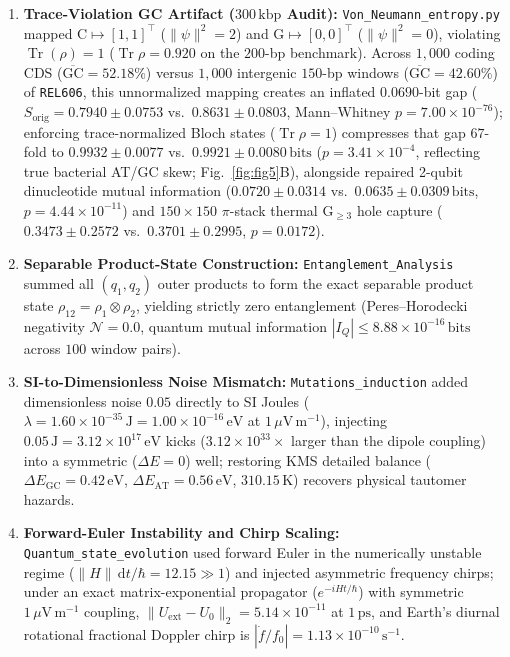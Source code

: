 \documentclass[10pt,letterpaper]{article}
\theoremstyle{plain}
\theoremstyle{definition}
\newcommand{\Tr}{\operatorname{Tr}}
\begin{document}
\begin{enumerate}[leftmargin=1.8em,itemsep=2pt]
    \item \textbf{Trace-Violation GC Artifact ($300\,\mathrm{kbp}$ Audit):} \texttt{Von\_\allowbreak Neumann\_\allowbreak entropy.py} mapped $\mathrm{C} \mapsto [1,1]^\top$ ($\|\psi\|^2 = 2$) and $\mathrm{G} \mapsto [0,0]^\top$ ($\|\psi\|^2 = 0$), violating $\Tr(\rho) = 1$ ($\Tr\rho = 0.920$ on the $200$-bp benchmark). Across $1{,}000$ coding CDS ($\overline{\mathrm{GC}} = 52.18\%$) versus $1{,}000$ intergenic $150$-bp windows ($\overline{\mathrm{GC}} = 42.60\%$) of \texttt{REL606}, this unnormalized mapping creates an inflated $0.0690$-bit gap ($S_{\mathrm{orig}} = 0.7940 \pm 0.0753$ vs.\ $0.8631 \pm 0.0803$, Mann--Whitney $p = 7.00 \times 10^{-76}$); enforcing trace-normalized Bloch states ($\Tr\rho = 1$) compresses that gap $67$-fold to $0.9932 \pm 0.0077$ vs.\ $0.9921 \pm 0.0080\,\mathrm{bits}$ ($p = 3.41 \times 10^{-4}$, reflecting true bacterial AT/GC skew; Fig.~\ref{fig:fig5}B), alongside repaired 2-qubit dinucleotide mutual information ($0.0720 \pm 0.0314$ vs.\ $0.0635 \pm 0.0309\,\mathrm{bits}$, $p = 4.44 \times 10^{-11}$) and $150 \times 150$ $\pi$-stack thermal $\mathrm{G}_{\ge 3}$ hole capture ($0.3473 \pm 0.2572$ vs.\ $0.3701 \pm 0.2995$, $p = 0.0172$).
    \item \textbf{Separable Product-State Construction:} \texttt{Entanglement\_\allowbreak Analysis} summed all $(q_1, q_2)$ outer products to form the exact separable product state $\rho_{12} = \rho_1 \otimes \rho_2$, yielding strictly zero entanglement (Peres--Horodecki negativity $\mathcal{N} = 0.0$, quantum mutual information $|I_Q| \le 8.88 \times 10^{-16}\,\mathrm{bits}$ across $100$ window pairs).
    \item \textbf{SI-to-Dimensionless Noise Mismatch:} \texttt{Mutations\_\allowbreak induction} added dimensionless noise $0.05$ directly to SI Joules ($\lambda = 1.60 \times 10^{-35}\,\mathrm{J} = 1.00 \times 10^{-16}\,\mathrm{eV}$ at $1\,\mu\mathrm{V\,m^{-1}}$), injecting $0.05\,\mathrm{J} = 3.12 \times 10^{17}\,\mathrm{eV}$ kicks ($3.12 \times 10^{33}\times$ larger than the dipole coupling) into a symmetric ($\Delta E = 0$) well; restoring KMS detailed balance ($\Delta E_{\mathrm{GC}} = 0.42\,\mathrm{eV}$, $\Delta E_{\mathrm{AT}} = 0.56\,\mathrm{eV}$, $310.15\,\mathrm{K}$) recovers physical tautomer hazards.
    \item \textbf{Forward-Euler Instability and Chirp Scaling:} \texttt{Quantum\_\allowbreak state\_\allowbreak evolution} used forward Euler in the numerically unstable regime ($\|H\|\,\mathrm{d}t/\hbar = 12.15 \gg 1$) and injected asymmetric frequency chirps; under an exact matrix-exponential propagator ($e^{-iHt/\hbar}$) with symmetric $1\,\mu\mathrm{V\,m^{-1}}$ coupling, $\|U_{\mathrm{ext}} - U_0\|_2 = 5.14 \times 10^{-11}$ at $1\,\mathrm{ps}$, and Earth's diurnal rotational fractional Doppler chirp is $|\dot{f}/f_0| = 1.13 \times 10^{-10}\,\mathrm{s}^{-1}$.
\end{enumerate}
\end{document}
